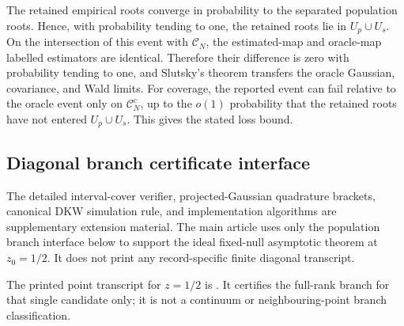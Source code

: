 The retained empirical roots converge in probability to the separated
population roots.  Hence, with probability tending to one, the retained roots
lie in \(U_p\cup U_s\).  On the intersection of this event with
\(\mathcal C_N\), the estimated-map and oracle-map labelled estimators are
identical.  Therefore their difference is zero with probability tending to
one, and Slutsky's theorem transfers the oracle Gaussian, covariance, and Wald
limits.  For coverage, the reported event can fail relative to the oracle
event only on \(\mathcal C_N^c\), up to the \(o(1)\) probability that the
retained roots have not entered \(U_p\cup U_s\).  This gives the stated loss
bound.
\else
\iffalse %

\subsection{Diagonal branch certificate interface}
\label{app:finite-domain-diagonal-certification-main}
\label{app:diagonal-branch-certificate-protocol-main}
\label{app:finite-projected-gaussian-certificates-main}
\label{app:finite-record-implementation-protocols-main}

The detailed interval-cover verifier, projected-Gaussian quadrature brackets,
canonical DKW simulation rule, and implementation algorithms are supplementary
extension material.  The main article uses only the population branch
interface below to support the ideal fixed-null asymptotic theorem at
\(z_0=1/2\).  It does not print any record-specific finite diagonal transcript.

\begin{remark}\label{rem:worked-diagonal-branch-certificate-main}
The printed point transcript for \(z=1/2\) is
.  It certifies the
full-rank branch for that single candidate only; it is not a continuum or
neighbouring-point branch classification.
\end{remark}

